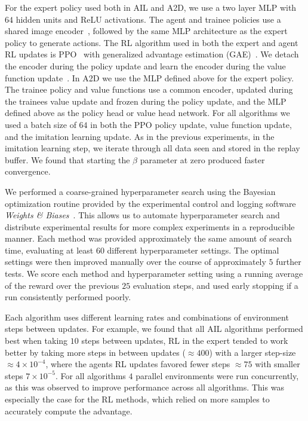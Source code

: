 For the expert policy used both in AIL and A2D, we use a two layer MLP with $64$ hidden units and ReLU activations. The agent and trainee policies use a shared image encoder~\citep{laskin2020reinforcement,laskin_srinivas2020curl,yarats2021image}, followed by the same MLP architecture as the expert policy to generate actions.  The RL algorithm used in both the expert and agent RL updates is PPO~\citep{schulman2017proximal} with generalized advantage estimation (GAE)~\citep{schulman2015high}.  We detach the encoder during the policy update and learn the encoder during the value function update~\citep{laskin2020reinforcement,laskin_srinivas2020curl,yarats2021image}. In A2D we use the MLP defined above for the expert policy.  The trainee policy and value functions use a common encoder, updated during the trainees value update and frozen during the policy update, and the MLP defined above as the policy head or value head network.  For all algorithms we used a batch size of $64$ in both the PPO policy update, value function update, and the imitation learning update.  As in the previous experiments, in the imitation learning step, we iterate through all data seen and stored in the replay buffer. We found that starting the $\beta$ parameter at zero produced faster convergence.

We performed a coarse-grained hyperparameter search using the Bayesian optimization routine provided by the experimental control and logging software \emph{Weights \& Biases}~\citep{wandb}.  This allows us to automate hyperparameter search and distribute experimental results for more complex experiments in a reproducible manner.  Each method was provided approximately the same amount of search time, evaluating at least $60$ different hyperparameter settings.  The optimal settings were then improved manually over the course of approximately $5$ further tests.  We score each method and hyperparameter setting using a running average of the reward over the previous $25$ evaluation steps, and used early stopping if a run consistently performed poorly.  

Each algorithm uses different learning rates and combinations of environment steps between updates. For example, we found that all AIL algorithms performed best when taking $10$ steps between updates, RL in the expert tended to work better by taking more steps in between updates ($\approx 400$) with a larger step-size $\approx 4\times 10^{-4}$, where the agents RL updates favored fewer steps $\approx 75$ with smaller steps $7 \times 10^{-5}$. For all algorithms $4$ parallel environments were run concurrently, as this was observed to improve performance across all algorithms. This was especially the case for the RL methods, which relied on more samples to accurately compute the advantage.  

